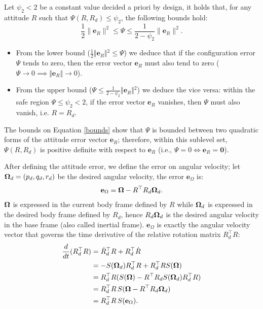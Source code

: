 \documentclass[10pt, a4paper]{report}
\begin{document}
Let $\psi_2< 2$ be a constant value decided a priori by design, it holds that, for any attitude $R$ such that $\Psi(R,R_d)\le \psi_2$, the following bounds hold:\begin{equation}\label{bounds}
    \frac{1}{2}\|\mathbf e_R\|^2\le\Psi\le\frac{1}{2-\psi_2}\|\mathbf e_R\|^2.
\end{equation}\begin{itemize}
    \item From the lower bound ($\frac{1}{2}\Vert{}\mathbf e_R\Vert{}^2 \le \Psi$) we deduce that if the configuration error $\Psi$ tends to zero, then the error vector $\mathbf e_R$ must also tend to zero ($\Psi \to 0 \implies \Vert{}\mathbf e_R\Vert{} \to 0$).
    \item From the upper bound ($\Psi \le \frac{1}{2-\psi_2}\Vert{}\mathbf e_R\Vert{}^2$) we deduce the vice versa: within the safe region $\Psi \le \psi_2 < 2$, if the error vector $\mathbf e_R$ vanishes, then $\Psi$  must also vanish, i.e. $R = R_d$.
\end{itemize}
\begin{boxobservation}{}{}
    The bounds on Equation \eqref{bounds} show that $\Psi$ is bounded between two quadratic forms of the attitude error vector $\mathbf{e}_R$; therefore, within this sublevel set, $\Psi(R, R_d)$ is positive definite with respect to $\mathbf{e}_R$ (i.e., $\Psi = 0 \iff \mathbf{e}_R = \mathbf{0}$).
\end{boxobservation}
After defining the attitude error, we define the error on angular velocity; let ${\boldsymbol{\Omega}}_d=(p_d,q_d,r_d)$ be the desired angular velocity, the error $\mathbf e_\Omega$ is:\begin{equation}
    \mathbf e_\Omega={\boldsymbol{\Omega}}-R^\top R_d{\boldsymbol{\Omega}}_d.
\end{equation}
${\boldsymbol{\Omega}}$ is expressed in the current body frame defined by $R$ while ${\boldsymbol{\Omega}}_d$ is expressed in the desired body frame defined by $R_d$, hence $R_d{\boldsymbol{\Omega}}_d$ is the desired angular velocity in the base frame (also called inertial frame). $\mathbf e_\Omega$ is exactly the angular velocity vector that governs the time derivative of the relative rotation matrix $R_d^\top R$:\begin{align}
    \frac{d}{dt}(R_d^\top R)&=\dot R_d^\top R+R_d^\top\dot R\\ 
    &=-S({\boldsymbol{\Omega}}_d)R_d^\top R+R_d^\top RS({\boldsymbol{\Omega}})\\
    &=R_d^\top R(S({\boldsymbol{\Omega}})-R^\top R_d S({\boldsymbol{\Omega}}_d)R_d^\top R)\\
    &=R_d^\top R\,S({\boldsymbol{\Omega}}-R^\top R_d{\boldsymbol{\Omega}}_d)\\
    &=R_d^\top R\,S(\mathbf e_\Omega).
\end{align}
\end{document}
